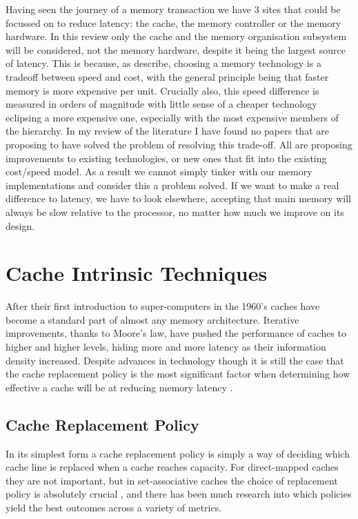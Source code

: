 Having seen the journey of a memory transaction we have 3 sites that could be focussed on to reduce latency: the cache, the memory controller or the memory hardware. In this review only the cache and the memory organisation subsystem will be considered, not the memory hardware, despite it being the largest source of latency. This is because, as \citet{pattersonComputerOrganizationDesign2018} describe, choosing a memory technology is a tradeoff between speed and cost, with the general principle being that faster memory is more expensive per unit. Crucially also, this speed difference is measured in orders of magnitude with little sense of a cheaper technology eclipsing a more expensive one, especially with the most expensive members of the hierarchy. In my review of the literature I have found no papers that are proposing to have solved the problem of resolving this trade-off. All are proposing improvements to existing technologies, or new ones that fit into the existing cost/speed model. As a result we cannot simply tinker with our memory implementations and consider this a problem solved. If we want to make a real difference to latency, we have to look elsewhere, accepting that main memory will always be slow relative to the processor, no matter how much we improve on its design.

\section{Cache Intrinsic Techniques}

\label{sec:cache}

After their first introduction to super-computers in the 1960's \cite{pattersonComputerOrganizationDesign2018} caches have become a standard part of almost any memory architecture. Iterative improvements, thanks to Moore's law, have pushed the performance of caches to higher and higher levels, hiding more and more latency as their information density increased. Despite advances in technology though it is still the case that the cache replacement policy is the most significant factor when determining how effective a cache will be at reducing memory latency \cite{hennessyComputerArchitectureQuantitative2019}.

\subsection{Cache Replacement Policy}
\label{sec:replacement_policy}

In its simplest form a cache replacement policy is simply a way of deciding which cache line is replaced when a cache reaches capacity. For direct-mapped caches they are not important, but in set-associative caches the choice of replacement policy is absolutely crucial \cite{hennessyComputerArchitectureQuantitative2019}, and there has been much research into which policies yield the best outcomes across a variety of metrics.

